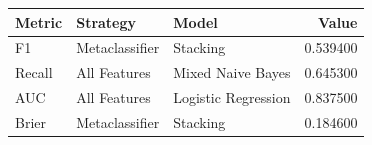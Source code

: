 \begin{tabular}{lllr}
\toprule
Metric & Strategy & Model & Value \\
\midrule
F1 & Metaclassifier & Stacking & 0.539400 \\
Recall & All Features & Mixed Naive Bayes & 0.645300 \\
AUC & All Features & Logistic Regression & 0.837500 \\
Brier & Metaclassifier & Stacking & 0.184600 \\
\bottomrule
\end{tabular}

